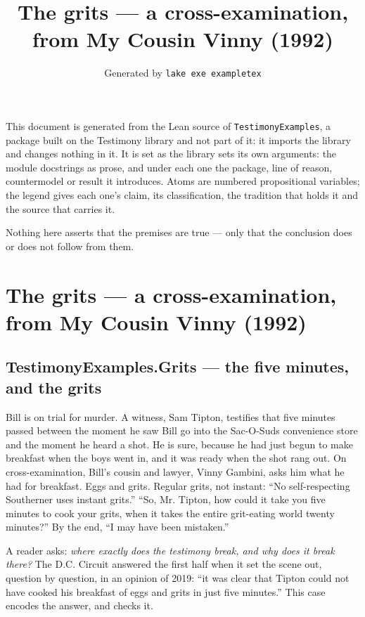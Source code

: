 \documentclass[11pt]{article}
\title{The grits — a cross-examination, from My Cousin Vinny (1992)}
\date{Generated by \texttt{lake exe exampletex}}
\begin{document}
\maketitle
\noindent This document is generated from the Lean source of \texttt{TestimonyExamples}, a package built on the Testimony library and not part of it: it imports the library and changes nothing in it. It is set as the library sets its own arguments: the module docstrings as prose, and under each one the package, line of reason, countermodel or result it introduces. Atoms are numbered propositional variables; the legend gives each one's claim, its classification, the tradition that holds it and the source that carries it.

\noindent Nothing here asserts that the premises are true --- only that the conclusion does or does not follow from them.

\tableofcontents
\clearpage
\section*{The grits — a cross-examination, from My Cousin Vinny (1992)}

\subsection*{TestimonyExamples.Grits — the five minutes, and the grits}
Bill is on trial for murder. A witness, Sam Tipton, testifies that five minutes passed between the moment he saw Bill go into the Sac-O-Suds convenience store and the moment he heard a shot. He is sure, because he had just begun to make breakfast when the boys went in, and it was ready when the shot rang out. On cross-examination, Bill’s cousin and lawyer, Vinny Gambini, asks him what he had for breakfast. Eggs and grits. Regular grits, not instant: “No self-respecting Southerner uses instant grits.” “So, Mr. Tipton, how could it take you five minutes to cook your grits, when it takes the entire grit-eating world twenty minutes?” By the end, “I may have been mistaken.”

A reader asks: \emph{where exactly does the testimony break, and why does it break there?} The D.C. Circuit answered the first half when it set the scene out, question by question, in an opinion of 2019: “it was clear that Tipton could not have cooked his breakfast of eggs and grits in just five minutes.” This case encodes the answer, and checks it.
\end{document}
